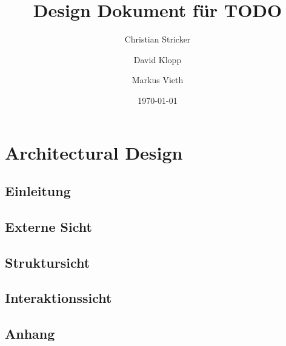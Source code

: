 \documentclass{book}
\title{Design Dokument für TODO}
\author{Christian Stricker \and David Klopp \and Markus Vieth}
\date{\today}
\begin{document}
\frontmatter
\maketitle
\tableofcontents
\mainmatter


\part{Architectural Design}

\chapter{Einleitung}

 
\chapter{Externe Sicht}


\chapter{Struktursicht}%
%
 
\chapter{Interaktionssicht}

\chapter*{Anhang}

 
\end{document}
